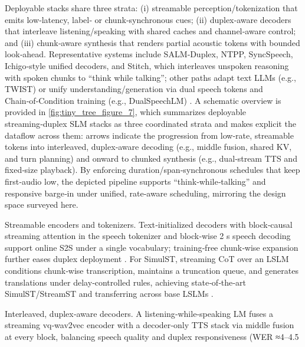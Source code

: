\documentclass{article}
\begin{document}
Deployable stacks share three strata: (i) streamable perception/tokenization that emits low‑latency, label‑ or chunk‑synchronous cues; (ii) duplex‑aware decoders that interleave listening/speaking with shared caches and channel‑aware control; and (iii) chunk‑aware synthesis that renders partial acoustic tokens with bounded look‑ahead. Representative systems include SALM‑Duplex, NTPP, SyncSpeech, Ichigo‑style unified decoders, and Stitch, which interleaves unspoken reasoning with spoken chunks to “think while talking”; other paths adapt text LLMs (e.g., TWIST) or unify understanding/generation via dual speech tokens and Chain‑of‑Condition training (e.g., DualSpeechLM) \cite{chiang2025stitchsimultaneousthinkingtalkingchunked,hassid2024textuallypretrainedspeechlanguagemodels,wang2025dualspeechlmtowardsunifiedspeechundersta}. A schematic overview is provided in \autoref{fig:tiny_tree_figure_7}, which summarizes deployable streaming‑duplex SLM stacks as three coordinated strata and makes explicit the dataflow across them: arrows indicate the progression from low‑rate, streamable tokens into interleaved, duplex‑aware decoding (e.g., middle fusion, shared KV, and turn planning) and onward to chunked synthesis (e.g., dual‑stream TTS and fixed‑size playback). By enforcing duration/span‑synchronous schedules that keep first‑audio low, the depicted pipeline supports “think‑while‑talking” and responsive barge‑in under unified, rate‑aware scheduling, mirroring the design space surveyed here.

Streamable encoders and tokenizers. Text‑initialized decoders with block‑causal streaming attention in the speech tokenizer and block‑wise 2 s speech decoding support online S2S under a single vocabulary; training‑free chunk‑wise expansion further eases duplex deployment \cite{zeng2024scalingspeechtextpretrainingsyntheticint,chang2024dcspinspeakerinvariantspeechtokenizerspo}. For SimulST, streaming CoT over an LSLM conditions chunk‑wise transcription, maintains a truncation queue, and generates translations under delay‑controlled rules, achieving state‑of‑the‑art SimulST/StreamST and transferring across base LSLMs \cite{guo2025streamuniachievingstreamingspeechtransla}.

Interleaved, duplex‑aware decoders. A listening‑while‑speaking LM fuses a streaming vq‑wav2vec encoder with a decoder‑only TTS stack via middle fusion at every block, balancing speech quality and duplex responsiveness (WER ≈4–4.5%
\end{document}
